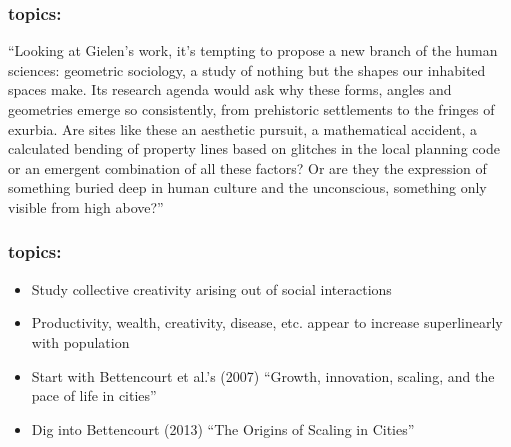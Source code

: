   \begin{frame}
    \frametitle{topics:}

    \begin{block}{}
      \small
      ``Looking at Gielen's work, it's tempting to propose a new branch of the
      human sciences: geometric sociology, a study of nothing but the shapes
      our inhabited spaces make. Its research agenda would ask why these
      forms, angles and geometries emerge so consistently, from prehistoric
      settlements to the fringes of exurbia. Are sites like these an
      aesthetic pursuit, a mathematical accident, a calculated bending of
      property lines based on glitches in the local planning code or an
      emergent combination of all these factors? Or are they the expression
      of something buried deep in human culture and the unconscious,
      something only visible from high above?''
    \end{block}

    \small
    
  \end{frame}




  \begin{frame}
    \frametitle{topics:}

    \begin{block}{}
    \begin{itemize}
    \item 
      Study collective creativity arising out of social interactions
    \item 
      Productivity, wealth, creativity, disease, etc. appear to increase superlinearly with population
    \item 
      Start with Bettencourt et al.'s (2007)
      ``Growth, innovation, scaling, and the pace of life in
      cities''\cite{bettencourt2007a}
    \item 
      Dig into Bettencourt (2013)
      ``The Origins of Scaling in Cities''\cite{bettencourt2007a}
    \end{itemize}
    \end{block}

  \end{frame}

